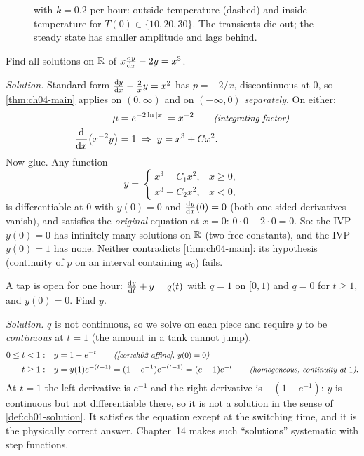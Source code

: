 \begin{figure}[ht]
  \centering
  
  \caption{ with $k = 0.2$ per hour: outside temperature
  (dashed) and inside temperature for $T(0)\in\{10, 20, 30\}$. The transients
  die out; the steady state has smaller amplitude and lags behind.}
  \label{fig:ch04-house}
\end{figure}

\begin{example}\label{ex:ch04-singular}
Find all solutions on $\mathbb{R}$ of $x\frac{\mathrm{d}y}{\mathrm{d}x} - 2y = x^3$.

\emph{Solution.} Standard form $\frac{\mathrm{d}y}{\mathrm{d}x} - \frac2xy = x^2$ has $p = -2/x$,
discontinuous at $0$, so \cref{thm:ch04-main} applies on $(0,\infty)$ and on
$(-\infty,0)$ \emph{separately}. On either:
\begin{align*}
  \mu &= e^{-2\ln|x|} = x^{-2}\qquad\text{\small\itshape(integrating factor)}\\
  \frac{\mathrm{d}}{\mathrm{d}x}\bigl(x^{-2}y\bigr) &= 1 \;\Rightarrow\; y = x^3 + Cx^2 .
\end{align*}
Now glue. Any function
\[
  y = \begin{cases}x^3 + C_1x^2, & x\ge0,\\ x^3 + C_2x^2, & x<0,\end{cases}
\]
is differentiable at $0$ with $y(0) = 0$ and $\frac{\mathrm{d}y}{\mathrm{d}x}(0) = 0$ (both one-sided
derivatives vanish), and satisfies the \emph{original} equation at $x = 0$:
$0\cdot0 - 2\cdot0 = 0$. So:
the IVP $y(0) = 0$ has infinitely many solutions on $\mathbb{R}$ (two free constants),
and the IVP $y(0) = 1$ has none. Neither contradicts \cref{thm:ch04-main}:
its hypothesis (continuity of $p$ on an interval containing $x_0$) fails.
\end{example}

\begin{example}\label{ex:ch04-switch}
A tap is open for one hour: $\frac{\mathrm{d}y}{\mathrm{d}t} + y = q(t)$ with $q = 1$ on $[0,1)$ and
$q = 0$ for $t\ge1$, and $y(0) = 0$. Find $y$.

\emph{Solution.} $q$ is not continuous, so we solve on each piece and require
$y$ to be \emph{continuous} at $t = 1$ (the amount in a tank cannot jump).
\begin{align*}
  0\le t<1:&\quad y = 1 - e^{-t} \why{\cref{cor:ch02-affine}, $y(0) = 0$}\\
  t\ge 1:&\quad y = y(1)e^{-(t-1)} = (1 - e^{-1})e^{-(t-1)} = (e-1)e^{-t}
     \why{homogeneous, continuity at $1$}.
\end{align*}
At $t = 1$ the left derivative is $e^{-1}$ and the right derivative is
$-(1 - e^{-1})$: $y$ is continuous but not differentiable there, so it is not a
solution in the sense of \cref{def:ch01-solution}. It satisfies the equation
except at the switching time, and it is the physically correct answer.
Chapter~14 makes such ``solutions'' systematic with step functions.
\end{example}

